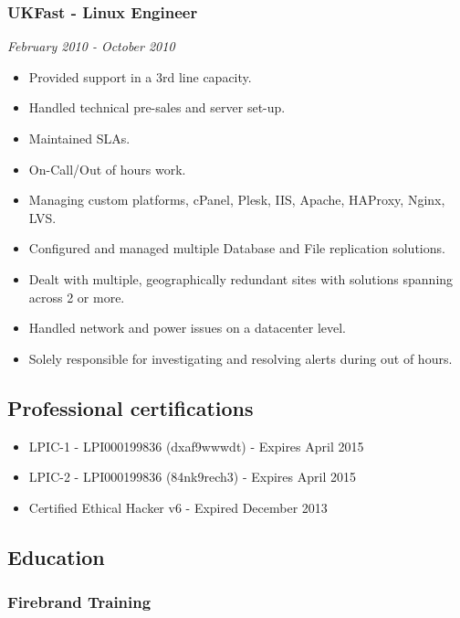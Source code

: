 \subsubsection{UKFast - Linux Engineer}\label{ukfast---linux-engineer}

\emph{February 2010 - October 2010}

\begin{itemize}
\itemsep1pt\parskip0pt
\item
  Provided support in a 3rd line capacity.
\item
  Handled technical pre-sales and server set-up.
\item
  Maintained SLAs.
\item
  On-Call/Out of hours work.
\item
  Managing custom platforms, cPanel, Plesk, IIS, Apache, HAProxy, Nginx,
  LVS.
\item
  Configured and managed multiple Database and File replication
  solutions.
\item
  Dealt with multiple, geographically redundant sites with solutions
  spanning across 2 or more.
\item
  Handled network and power issues on a datacenter level.
\item
  Solely responsible for investigating and resolving alerts during out
  of hours.
\end{itemize}

\subsection{Professional
certifications}\label{professional-certifications}

\begin{itemize}
\itemsep1pt\parskip0pt
\item
  LPIC-1 - LPI000199836 (dxaf9wwwdt) - Expires April 2015
\item
  LPIC-2 - LPI000199836 (84nk9rech3) - Expires April 2015
\item
  Certified Ethical Hacker v6 - Expired December 2013
\end{itemize}

\subsection{Education}\label{education}

\subsubsection{Firebrand Training}\label{firebrand-training}

